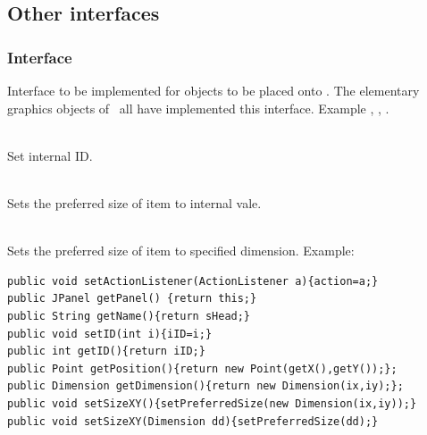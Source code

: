 \item {}
\item {}
\item {}
\item {}
\item {}
\item {}
\item {}
\item {}
\item {}
\item {}
\item {}
\item {}
\item {}
\item {}
\item {}
\item {}
\item {}
\ecir
\subsection{Other interfaces}
\subsubsection{Interface }
Interface to be implemented for objects to be placed onto .
The elementary graphics objects of \gui\ all have implemented this interface.
Example , , .
\bcir
\item {}
\item {}
\item {}
\item {}
\item {}
\item {}
\item {}\\
Set internal ID.
\item {}\\
Sets the preferred size of item to internal vale.
\item {}\\
Sets the preferred size of item to specified dimension.
\ecir
Example:
{\small \begin{verbatim}
public void setActionListener(ActionListener a){action=a;}
public JPanel getPanel() {return this;}
public String getName(){return sHead;}
public void setID(int i){iID=i;}
public int getID(){return iID;}
public Point getPosition(){return new Point(getX(),getY());};
public Dimension getDimension(){return new Dimension(ix,iy);};
public void setSizeXY(){setPreferredSize(new Dimension(ix,iy));}
public void setSizeXY(Dimension dd){setPreferredSize(dd);}
\end{verbatim}
}
